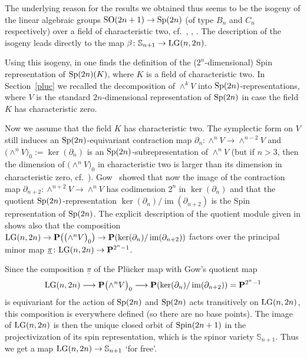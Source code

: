 \documentclass[pdftex]{sigma}
\newcommand{\PP}{{\bf P}}
\newcommand{\bS}{{\mathbb S}}
\newcommand{\im}{\operatorname{im}}
\numberwithin{equation}{section}
\begin{document}
\begin{Remark}\label{remarkisog} The underlying reason for the results we obtained thus seems to be the isogeny of the linear algebraic groups ${\rm SO}(2n+1)\rightarrow {\rm Sp}(2n)$ (of type $B_n$ and $C_n$ respectively) over a field of characteristic two, cf.\ \cite[Section~4.11]{Steinberg}, \cite{Milne}, \cite[Section~7.1, Remark 7.1.6]{CGP}. The description of the isogeny leads directly to the map $\beta\colon \bS_{n+1}\rightarrow {\rm LG}(n,2n)$.

Using this isogeny, in \cite[p.~197]{Kleidman} one finds the definition of the ($2^n$-dimensional) Spin representation of ${\rm Sp}(2n)(K)$, where $K$ is a field of characteristic two. In Section~\ref{pluc} we recalled the decomposition of $\wedge^kV$ into ${\rm Sp}(2n)$-representations, where $V$ is the standard $2n$-dimensional representation of ${\rm Sp}(2n)$ in case the field $K$ has characteristic zero.

Now we assume that the field $K$ has characteristic two. The symplectic form on $V$ still induces an ${\rm Sp}(2n)$-equivariant contraction map $\partial_n\colon \wedge^nV\rightarrow \wedge^{n-2}V$ and $\big({\wedge}^nV\big)_0:=\ker(\partial_n)$ is an ${\rm Sp}(2n)$-subrepresentation of $\wedge^n V$ (but if $n>3$, then the dimension of $\big({\wedge}^nV\big)_0$ in characteristic two is larger than its dimension in characteristic zero, cf.\ \cite[Theorem~2.2]{Gow}). Gow~\cite{Gow} showed that now the image of the contraction map $\partial_{n+2}\colon \wedge^{n+2}V\rightarrow \wedge^nV$ has codimension $2^n$ in $\ker(\partial_n)$ and that the quotient ${\rm Sp}(2n)$-representation $\ker(\partial_n)/\im(\partial_{n+2})$ is the Spin representation of ${\rm Sp}(2n)$. The explicit description of the quotient module given in \cite[Section~3]{Gow} shows also that the composition ${\rm LG}(n,2n)\rightarrow\PP\big(\big({\wedge}^n V\big)_0\big)\rightarrow\PP(\ker(\partial_n)/\im(\partial_{n+2}))$ factors over the principal minor map $\underline{\pi}\colon {\rm LG}(n,2n)\rightarrow\PP^{2^n-1}$.

Since the composition $\underline{\pi}$ of the Pl\"ucker map with Gow's quotient map
\begin{gather*}
{\rm LG}(n,2n) \longrightarrow \PP\big({\wedge}^nV\big)_0 \longrightarrow \PP(\ker(\partial_n)/\im(\partial_{n+2})) = \PP^{2^n-1}
\end{gather*}
is equivariant for the action of ${\rm Sp}(2n)$ and ${\rm Sp}(2n)$ acts transitively on ${\rm LG}(n,2n)$, this composition is everywhere defined (so there are no base points). The image of ${\rm LG}(n,2n)$ is then the unique closed orbit of ${\rm Spin}(2n+1)$ in the projectivization of its spin representation, which is the spinor variety $\bS_{n+1}$. Thus we get a map ${\rm LG}(n,2n)\rightarrow \bS_{n+1}$ `for free'.


\end{Remark}
\end{document}
